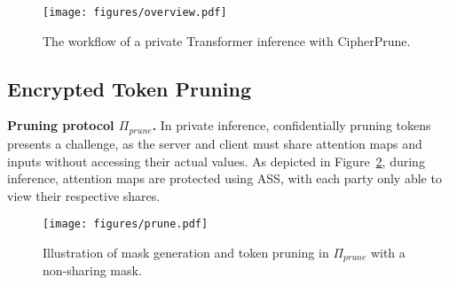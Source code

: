 \begin{figure}[h]
    \centering
    \texttt{[image: figures/overview.pdf]}
    \captionsetup{skip=2pt}
    \vspace{-0.1in}
    \caption{The workflow of a private Transformer inference with CipherPrune. }
    \label{fig:overview}
\vspace{-0.2in}
\end{figure}

\subsection{Encrypted Token Pruning}
\label{sec:prune}
\noindent\textbf{Pruning protocol $\Pi_{prune}$.} In private inference, confidentially pruning tokens presents a challenge, as the server and client must share attention maps and inputs without accessing their actual values. As depicted in Figure~\ref{fig:prune}, during inference, attention maps are protected using ASS, with each party only able to view their respective shares. %

\begin{figure}[h]
    \vspace{-0.1in}
    \centering
\texttt{[image: figures/prune.pdf]}
    \captionsetup{skip=2pt}
    \caption{Illustration of mask generation and token pruning in $\Pi_{prune}$ with a non-sharing mask. }
    \label{fig:prune}
     \vspace{-0.1in}
\end{figure}

